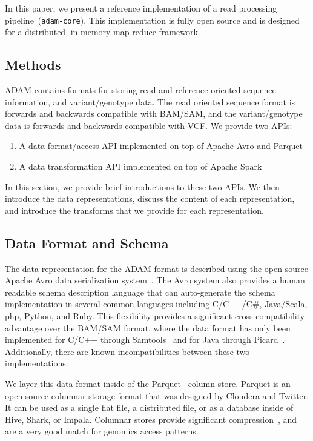 \documentclass{bioinfo}
\begin{document}
In this paper, we present a reference implementation of a read processing pipeline~(\texttt{adam-core}). This implementation is fully open source
and is designed for a distributed, in-memory map-reduce framework. 

\begin{methods}
\section{Methods}
\label{sec:methods}

ADAM contains formats for storing read and reference oriented sequence information, and variant/genotype data.
The read oriented sequence format is forwards and backwards compatible with BAM/SAM, and the variant/genotype
data is forwards and backwards compatible with VCF. We provide two APIs:

\begin{enumerate}
\item A data format/access API implemented on top of Apache Avro and Parquet
\item A data transformation API implemented on top of Apache Spark
\end{enumerate}

In this section, we provide brief introductions to these two APIs. We then introduce the data representations, discuss the content
of each representation, and introduce the transforms that we provide for each representation.

\subsection{Data Format and Schema}
\label{sec:data-format-and-schema}

The data representation for the ADAM format is described using the open source Apache Avro data serialization
system~\citep{avro}. The Avro system also provides a human readable schema description language that can
auto-generate the schema implementation in several common languages including C/C++/C\#, Java/Scala, php,
Python, and Ruby. This flexibility provides a significant cross-compatibility advantage over the BAM/SAM format,
where the data format has only been implemented for C/C++ through Samtools~\citep{li09} and for Java through
Picard~\citep{picard}. Additionally, there are known incompatibilities between these two implementations.

We layer this data format inside of the Parquet~\citep{parquet} column store. Parquet is an open source columnar storage
format that was designed by Cloudera and Twitter. It can be used as a single flat file, a distributed file, or as a database inside of Hive, Shark, or Impala. Columnar stores provide significant compression~\citep{abadi06}, and are a very good match for genomics access patterns.


\end{methods}
\end{document}
